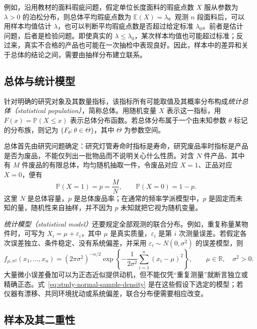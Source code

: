 例如，沿用教材的面料瑕疵问题，假定单位长度面料的瑕疵点数 $X$ 服从参数为 $\lambda>0$ 的泊松分布，则总体平均瑕疵点数为 $\mathbb E(X)=\lambda$。观测 $n$ 段面料后，可以用样本均值估计 $\lambda$，也可以判断平均瑕疵点数是否超过给定标准 $\lambda_0$。前者是估计问题，后者是检验问题。即使真实的 $\lambda\le\lambda_0$，某次样本均值也可能超过标准；反过来，真实不合格的产品也可能在一次抽检中表现良好。因此，样本中的差异和关于总体的结论之间，需要由抽样分布建立联系。

\subsection{总体与统计模型}

\begin{definition}[统计总体]
\label{def:study-population}
针对明确的研究对象及其数量指标，该指标所有可能取值及其概率分布构成\emph{统计总体（statistical population）}，简称总体。用随机变量 $X$ 表示这一指标，用 $F(x)=\mathbb P(X\le x)$ 表示总体分布函数。若总体分布属于一个由未知参数 $\theta$ 标记的分布族，则记为 $\{F_\theta:\theta\in\Theta\}$，其中 $\Theta$ 为参数空间。
\end{definition}

总体首先由研究问题确定：研究灯管寿命时指标是寿命，研究废品率时指标是产品是否为废品，不能仅列出一批物品而不说明关心什么性质。对含 $N$ 件产品、其中有 $M$ 件废品的有限总体，均匀随机抽取一件，令废品对应 $X=1$、正品对应 $X=0$，便有
\[
  \mathbb P(X=1)=p=\frac MN,\qquad
  \mathbb P(X=0)=1-p.
\]
这里 $N$ 是总体容量，$p$ 是总体废品率；在通常的频率学派模型中，$p$ 是固定而未知的量，随机性来自抽样，并不因为 $p$ 未知就把它视为随机变量。

\emph{统计模型（statistical model）}还要规定全部观测的联合分布。例如，重复称量某物件时，可写为 $X_i=\mu+\varepsilon_i$，其中 $\mu$ 是真实质量，$\varepsilon_i$ 是第 $i$ 次测量误差。若假定各次误差独立、条件稳定、没有系统偏差，并采用 $\varepsilon_i\sim N(0,\sigma^2)$ 的误差模型，则
\begin{equation}
  f_{\mu,\sigma^2}(x_1,\ldots,x_n)
  =(2\pi\sigma^2)^{-n/2}
    \exp\left\{-\frac1{2\sigma^2}\sum_{i=1}^{n}(x_i-\mu)^2\right\},
  \qquad \mu\in\mathbb R,\quad \sigma^2>0.
  \label{eq:study-normal-sample-density}
\end{equation}
大量微小误差叠加可以为正态近似提供动机，但不能仅凭“重复测量”就断言独立或精确正态。式~\eqref{eq:study-normal-sample-density} 是在这些假设下选定的模型；若仪器有漂移、共同环境扰动或系统偏差，联合分布便需要相应改变。

\subsection{样本及其二重性}

